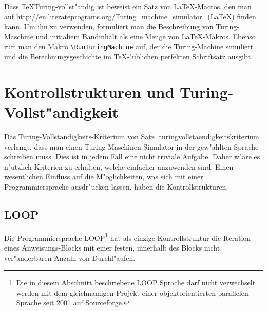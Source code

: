 Dass \TeX Turing-vollst"andig ist beweist ein Satz von \LaTeX-Macros, den
man auf
\url{http://en.literateprograms.org/Turing\_machine\_simulator\_(LaTeX)}
finden kann.
Um ihn zu verwenden, formuliert man die Beschreibung
von Turing-Maschine und initialiem Bandinhalt als eine Menge von
\LaTeX-Makros. Ebenso ruft man den Makro \verb+\RunTuringMachine+ auf,
der die Turing-Machine simuliert und die Berechnungsgeschichte im
\TeX-"ublichen perfekten Schriftsatz ausgibt.



\section{Kontrollstrukturen und Turing-Vollst"andigkeit}
Das Turing-Vollstandigkeits-Kriterium von Satz
\ref{turingvollstaendigkeitskriterium} verlangt, dass man einen
Turing-Maschinen-Simulator in der gew"ahlten Sprache schreiben muss.
Dies ist in jedem Fall eine nicht triviale Aufgabe.
Daher w"are es n"utzlich Kriterien zu erhalten, welche einfacher
anzuwenden sind. Einen wesentlichen Einfluss auf die M"oglichkeiten,
was sich mit einer Programmiersprache ausdr"ucken lassen, haben die
Kontrollstrukturen.

\newcommand{\assignment}{\mathbin{\texttt{:=}}}

\subsection{LOOP}
Die Programmiersprache
LOOP\footnote{Die in diesem Abschnitt beschriebene
LOOP Sprache darf nicht verwechselt werden mit dem gleichnamigen
Projekt einer objektorientierten parallelen Sprache seit
2001 auf Sourceforge.}
hat als einzige Kontrollstruktur die
Iteration eines Anweisungs-Blocks mit einer festen, innerhalb des
Blocks nicht ver"anderbaren Anzahl von Durchl"aufen.

